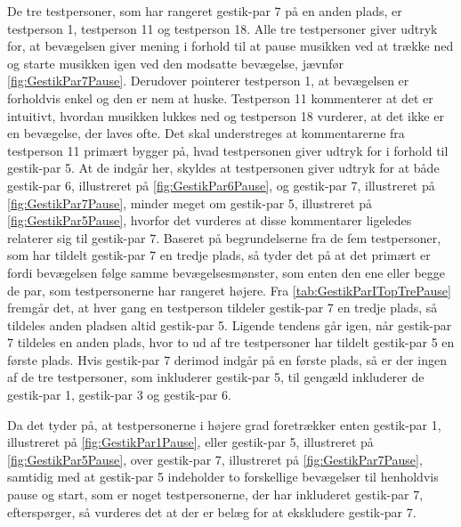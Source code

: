 De tre testpersoner, som har rangeret gestik-par 7 på en anden plads, er testperson 1, testperson 11 og testperson 18. Alle tre testpersoner giver udtryk for, at bevægelsen giver mening i forhold til at pause musikken ved at trække ned og starte musikken igen ved den modsatte bevægelse, jævnfør \autoref{fig:GestikPar7Pause}. Derudover pointerer testperson 1, at bevægelsen er forholdvis enkel og den er nem at huske. Testperson 11 kommenterer at det er intuitivt, hvordan musikken lukkes ned og testperson 18 vurderer, at det ikke er en bevægelse, der laves ofte. Det skal understreges at kommentarerne fra testperson 11 primært bygger på, hvad testpersonen giver udtryk for i forhold til gestik-par 5. At de indgår her, skyldes at testpersonen giver udtryk for at både gestik-par 6, illustreret på \autoref{fig:GestikPar6Pause}, og gestik-par 7, illustreret på \autoref{fig:GestikPar7Pause}, minder meget om gestik-par 5, illustreret på \autoref{fig:GestikPar5Pause}, hvorfor det vurderes at disse kommentarer ligeledes relaterer sig til gestik-par 7. Baseret på begrundelserne fra de fem testpersoner, som har tildelt gestik-par 7 en tredje plads, så tyder det på at det primært er fordi bevægelsen følge samme bevægelsesmønster, som enten den ene eller begge de par, som testpersonerne har rangeret højere. Fra \autoref{tab:GestikParITopTrePause} fremgår det, at hver gang en testperson tildeler gestik-par 7 en tredje plads, så tildeles anden pladsen altid gestik-par 5. Ligende tendens går igen, når gestik-par 7 tildeles en anden plads, hvor to ud af tre testpersoner har tildelt gestik-par 5 en første plads. Hvis gestik-par 7 derimod indgår på en første plads, så er der ingen af de tre testpersoner, som inkluderer gestik-par 5, til gengæld inkluderer de gestik-par 1, gestik-par 3 og gestik-par 6. 

Da det tyder på, at testpersonerne i højere grad foretrækker enten gestik-par 1, illustreret på \autoref{fig:GestikPar1Pause}, eller gestik-par 5, illustreret på \autoref{fig:GestikPar5Pause}, over gestik-par 7, illustreret på \autoref{fig:GestikPar7Pause}, samtidig med at gestik-par 5 indeholder to forskellige bevægelser til henholdvis pause og start, som er noget testpersonerne, der har inkluderet gestik-par 7, efterspørger, så vurderes det at der er belæg for at ekskludere gestik-par 7. 
%
